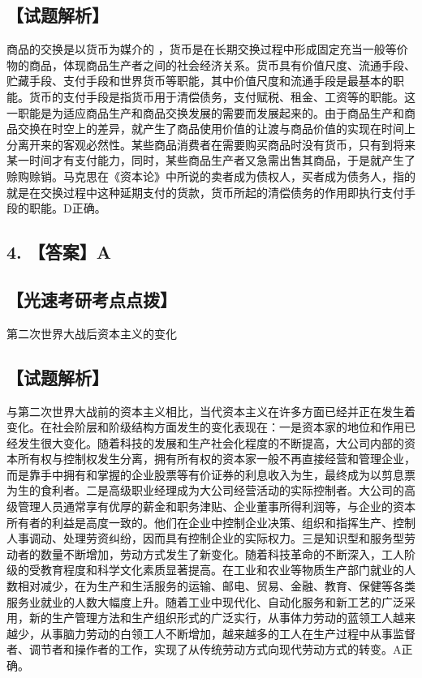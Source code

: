 \documentclass[UTF8,11pt]{ctexart}
\begin{document}
\subsection*{【试题解析】}

商品的交换是以货币为媒介的 ，货币是在长期交换过程中形成固定充当一般等价物的商品，体现商品生产者之间的社会经济关系。货币具有价值尺度、流通手段、贮藏手段、支付手段和世界货币等职能，其中价值尺度和流通手段是最基本的职能。货币的支付手段是指货币用于清偿债务，支付赋税、租金、工资等的职能。这一职能是为适应商品生产和商品交换发展的需要而发展起来的。由于商品生产和商品交换在时空上的差异，就产生了商品使用价值的让渡与商品价值的实现在时间上分离开来的客观必然性。某些商品消费者在需要购买商品时没有货币，只有到将来某一时间才有支付能力，同时，某些商品生产者又急需出售其商品，于是就产生了赊购赊销。马克思在《资本论》中所说的卖者成为债权人，买者成为债务人，指的就是在交换过程中这种延期支付的货款，货币所起的清偿债务的作用即执行支付手段的职能。D正确。


\subsection*{4. 【答案】A}

\subsection*{【光速考研考点点拨】}

第二次世界大战后资本主义的变化


\subsection*{【试题解析】}

与第二次世界大战前的资本主义相比，当代资本主义在许多方面已经并正在发生着变化。在社会阶层和阶级结构方面发生的变化表现在：一是资本家的地位和作用已经发生很大变化。随着科技的发展和生产社会化程度的不断提高，大公司内部的资本所有权与控制权发生分离，拥有所有权的资本家一般不再直接经营和管理企业，而是靠手中拥有和掌握的企业股票等有价证券的利息收入为生，最终成为以剪息票为生的食利者。二是高级职业经理成为大公司经营活动的实际控制者。大公司的高级管理人员通常享有优厚的薪金和职务津贴、企业董事所得利润等，与企业的资本所有者的利益是高度一致的。他们在企业中控制企业决策、组织和指挥生产、控制人事调动、处理劳资纠纷，因而具有控制企业的实际权力。三是知识型和服务型劳动者的数量不断增加，劳动方式发生了新变化。随着科技革命的不断深入，工人阶级的受教育程度和科学文化素质显著提高。在工业和农业等物质生产部门就业的人数相对减少，在为生产和生活服务的运输、邮电、贸易、金融、教育、保健等各类服务业就业的人数大幅度上升。随着工业中现代化、自动化服务和新工艺的广泛采用，新的生产管理方法和生产组织形式的广泛实行，从事体力劳动的蓝领工人越来越少，从事脑力劳动的白领工人不断增加，越来越多的工人在生产过程中从事监督者、调节者和操作者的工作，实现了从传统劳动方式向现代劳动方式的转变。A正确。
\end{document}
